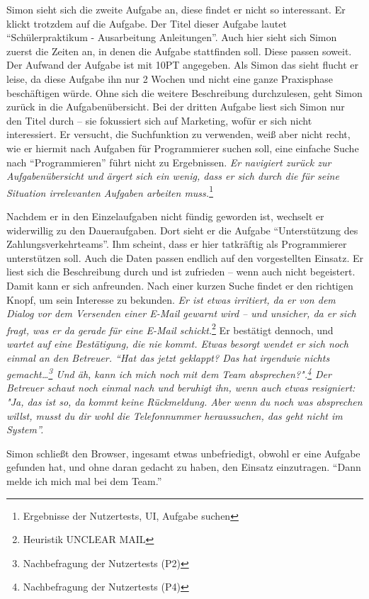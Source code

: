 \documentclass[
  12pt,
  ngerman,
  a4paper,
]{article}
\begin{document}
Simon sieht sich die zweite Aufgabe an, diese findet er nicht so
interessant. Er klickt trotzdem auf die Aufgabe. Der Titel dieser
Aufgabe lautet ``Schülerpraktikum - Ausarbeitung Anleitungen''. Auch
hier sieht sich Simon zuerst die Zeiten an, in denen die Aufgabe
stattfinden soll. Diese passen soweit. Der Aufwand der Aufgabe ist mit
10PT angegeben. Als Simon das sieht flucht er leise, da diese Aufgabe
ihn nur 2 Wochen und nicht eine ganze Praxisphase beschäftigen würde.
Ohne sich die weitere Beschreibung durchzulesen, geht Simon zurück in
die Aufgabenübersicht. Bei der dritten Aufgabe liest sich Simon nur den
Titel durch -- sie fokussiert sich auf Marketing, wofür er sich nicht
interessiert. Er versucht, die Suchfunktion zu verwenden, weiß aber
nicht recht, wie er hiermit nach Aufgaben für Programmierer suchen soll,
eine einfache Suche nach ``Programmieren'' führt nicht zu Ergebnissen.
\emph{Er navigiert zurück zur Aufgabenübersicht und ärgert sich ein
wenig, dass er sich durch die für seine Situation irrelevanten Aufgaben
arbeiten muss.}\footnote{Ergebnisse der Nutzertests, UI, Aufgabe suchen}

Nachdem er in den Einzelaufgaben nicht fündig geworden ist, wechselt er
widerwillig zu den Daueraufgaben. Dort sieht er die Aufgabe
``Unterstützung des Zahlungsverkehrteams''. Ihm scheint, dass er hier
tatkräftig als Programmierer unterstützen soll. Auch die Daten passen
endlich auf den vorgestellten Einsatz. Er liest sich die Beschreibung
durch und ist zufrieden -- wenn auch nicht begeistert. Damit kann er
sich anfreunden. Nach einer kurzen Suche findet er den richtigen Knopf,
um sein Interesse zu bekunden. \emph{Er ist etwas irritiert, da er von
dem Dialog vor dem Versenden einer E-Mail gewarnt wird -- und unsicher,
da er sich fragt, was er da gerade für eine E-Mail schickt.}\footnote{Heuristik
  UNCLEAR MAIL} Er bestätigt dennoch, und \emph{wartet auf eine
Bestätigung, die nie kommt. Etwas besorgt wendet er sich noch einmal an
den Betreuer. ``Hat das jetzt geklappt? Das hat irgendwie nichts
gemacht\ldots{}\emph{\footnote{Nachbefragung der Nutzertests (P2)} Und
äh, kann ich mich noch }mit dem Team absprechen?\emph{".\footnote{Nachbefragung
  der Nutzertests (P4)} Der Betreuer schaut noch einmal nach und
beruhigt ihn, wenn auch etwas resigniert: "}Ja, das ist so, da kommt
keine Rückmeldung\emph{. Aber wenn du noch was absprechen willst, }musst
du dir wohl die Telefonnummer heraussuchen, das geht nicht im System''.}

Simon schließt den Browser, ingesamt etwas unbefriedigt, obwohl er eine
Aufgabe gefunden hat, und ohne daran gedacht zu haben, den Einsatz
einzutragen. ``Dann melde ich mich mal bei dem Team.''
\end{document}
